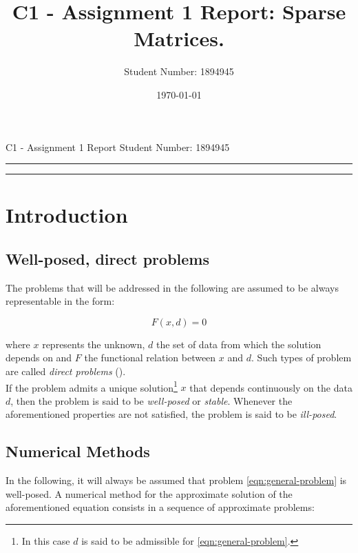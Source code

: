 \documentclass{article}
\title{C1 - Assignment 1 Report: Sparse Matrices.} %
\author{Student Number: 1894945} %
\date{\today} %
\theoremstyle{theorem}
\theoremstyle{definition}
\begin{document}
\maketitle %

\begin{center}
C1 - Assignment 1 Report \hfill
Student Number: 1894945
\vspace{3pt} \hrule \vspace{3pt} \hrule
\end{center}

\tableofcontents

\clearpage
\begin{abstract}


\end{abstract}
\clearpage 

\section{Introduction}

\subsection{Well-posed, direct problems}
The problems that will be addressed in the following are assumed to be always representable in the form: 

\begin{equation}
	\label{eqn:general-problem}
	F(x, d) = 0
\end{equation}

where $x$ represents the unknown, $d$ the set of data from which the solution depends on and $F$ the functional relation between $x$ and $d$. Such types of problem are called \emph{direct problems} (\cite{numerical-math}).\\
If the problem admits a unique solution\footnote{In this case $d$ is said to be admissible for \ref{eqn:general-problem}.} $x$ that depends continuously on the data $d$, then the problem is said to be \emph{well-posed} or \emph{stable}. Whenever the aforementioned properties are not satisfied, the problem is said to be \emph{ill-posed}.\\

\subsection{Numerical Methods}
In the following, it will always be assumed that problem \ref{eqn:general-problem} is well-posed. A numerical method for the approximate solution of the aforementioned equation consists in a sequence of approximate problems:
\end{document}
